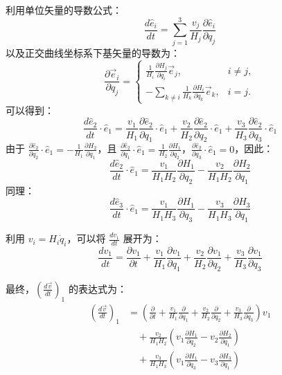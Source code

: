 \documentclass[12pt, a4paper, oneside, UTF8]{ctexbook}  %
\begin{document}
\begin{defn}
\begin{tui}
利用单位矢量的导数公式：
\[
\frac{d\hat{e}_i}{dt} = \sum_{j=1}^3 \frac{v_j}{H_j} \frac{\partial \hat{e}_i}{\partial q_j}
\]
以及正交曲线坐标系下基矢量的导数为：
\[
\frac{\partial \vec{e}_i}{\partial q_j} = 
\begin{cases}
\frac{1}{H_i} \frac{\partial H_j}{\partial q_i} \vec{e}_j, & i \neq j, \\
-\sum_{k \neq i} \frac{1}{H_k} \frac{\partial H_i}{\partial q_k} \vec{e}_k, & i = j.
\end{cases}
\]
可以得到：
\[
\frac{d\hat{e}_2}{dt} \cdot \hat{e}_1 = \frac{v_1}{H_1} \frac{\partial \hat{e}_2}{\partial q_1} \cdot \hat{e}_1 + \frac{v_2}{H_2} \frac{\partial \hat{e}_2}{\partial q_2} \cdot \hat{e}_1 + \frac{v_3}{H_3} \frac{\partial \hat{e}_2}{\partial q_3} \cdot \hat{e}_1
\]
由于 \(\frac{\partial \hat{e}_2}{\partial q_2} \cdot \hat{e}_1 = -\frac{1}{H_1} \frac{\partial H_2}{\partial q_1}\)，且 \(\frac{\partial \hat{e}_2}{\partial q_1} \cdot \hat{e}_1 = \frac{1}{H_2} \frac{\partial H_1}{\partial q_2}\)，\(\frac{\partial \hat{e}_2}{\partial q_3} \cdot \hat{e}_1 = 0\)，因此：
\[
\frac{d\hat{e}_2}{dt} \cdot \hat{e}_1 = \frac{v_1}{H_1 H_2} \frac{\partial H_1}{\partial q_2}-\frac{v_2}{H_1 H_2} \frac{\partial H_2}{\partial q_1}
\]
同理：
\[
\frac{d\hat{e}_3}{dt} \cdot \hat{e}_1 = \frac{v_1}{H_1 H_3}\frac{\partial H_1}{\partial q_3}-\frac{v_3}{H_1 H_3}\frac{\partial H_3}{\partial q_1}
\]

利用 \( v_i = H_i \dot{q}_i \)，可以将 \(\frac{dv_1}{dt}\) 展开为：
\[
\frac{dv_1}{dt} = \frac{\partial v_1}{\partial t} + \frac{v_1}{H_1} \frac{\partial v_1}{\partial q_1} 
+ \frac{v_2}{H_2} \frac{\partial v_1}{\partial q_2} + \frac{v_3}{H_3} \frac{\partial v_1}{\partial q_3}
\]

最终，\(\left(\frac{d\vec{v}}{dt}\right)_1\) 的表达式为：
\begin{align*}
    \left(\frac{d\vec{v}}{dt}\right)_1 &= \left(\frac{\partial}{\partial t} + \frac{v_1}{H_1} \frac{\partial}{\partial q_1} + \frac{v_2}{H_2} \frac{\partial}{\partial q_2} + \frac{v_3}{H_3} \frac{\partial}{\partial q_3}\right) v_1\\&\quad
    + \frac{v_2}{H_1 H_2} \left(v_1 \frac{\partial H_1}{\partial q_2} - v_2 \frac{\partial H_2}{\partial q_1}\right)
    \\&\quad+ \frac{v_3}{H_1 H_3} \left(v_1 \frac{\partial H_1}{\partial q_3} - v_3 \frac{\partial H_3}{\partial q_1}\right) 
\end{align*}
\end{tui}
\end{defn}
\end{document}
